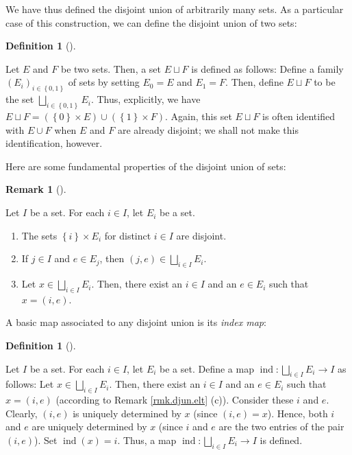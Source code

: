 \documentclass[numbers=enddot,12pt,final,onecolumn,notitlepage,abstracton]{scrartcl}
\theoremstyle{definition}
\newtheorem{defi}[theo]{Definition}
\newenvironment{definition}[1][]
{\begin{defi}[#1]\begin{leftbar}}
{\end{leftbar}\end{defi}}
\newtheorem{remk}[theo]{Remark}
\newenvironment{remark}[1][]
{\begin{remk}[#1]\begin{leftbar}}
{\end{leftbar}\end{remk}}
\newenvironment{verlong}{}{}
\begin{document}
\begin{verlong}
\begin{footnotesize}
We have thus defined the disjoint union of arbitrarily many sets. As a
particular case of this construction, we can define the disjoint union of two sets:

\begin{definition}
\label{def.djun.sets2}Let $E$ and $F$ be two sets. Then, a set $E\sqcup F$ is
defined as follows: Define a family $\left(  E_{i}\right)  _{i\in\left\{
0,1\right\}  }$ of sets by setting $E_{0}=E$ and $E_{1}=F$. Then, define
$E\sqcup F$ to be the set $\bigsqcup_{i\in\left\{  0,1\right\}  }E_{i}$. Thus,
explicitly, we have $E\sqcup F=\left(  \left\{  0\right\}  \times E\right)
\cup\left(  \left\{  1\right\}  \times F\right)  $. Again, this set $E\sqcup
F$ is often identified with $E\cup F$ when $E$ and $F$ are already disjoint;
we shall not make this identification, however.
\end{definition}

Here are some fundamental properties of the disjoint union of sets:

\begin{remark}
\label{rmk.djun.elt}Let $I$ be a set. For each $i\in I$, let $E_{i}$ be a set.

\begin{enumerate}
\item[(a)] The sets $\left\{  i\right\}  \times E_{i}$ for distinct $i\in I$
are disjoint.

\item[(b)] If $j\in I$ and $e\in E_{j}$, then $\left(  j,e\right)
\in\bigsqcup_{i\in I}E_{i}$.

\item[(c)] Let $x\in\bigsqcup_{i\in I}E_{i}$. Then, there exist an $i\in I$
and an $e\in E_{i}$ such that $x=\left(  i,e\right)  $.
\end{enumerate}
\end{remark}

A basic map associated to any disjoint union is its \textit{index map}:

\begin{definition}
\label{def.djun.ind}Let $I$ be a set. For each $i\in I$, let $E_{i}$ be a set.
Define a map $\operatorname*{ind}:\bigsqcup_{i\in I}E_{i}\rightarrow I$ as
follows: Let $x\in\bigsqcup_{i\in I}E_{i}$. Then, there exist an $i\in I$ and
an $e\in E_{i}$ such that $x=\left(  i,e\right)  $ (according to Remark
\ref{rmk.djun.elt} (c)). Consider these $i$ and $e$. Clearly, $\left(
i,e\right)  $ is uniquely determined by $x$ (since $\left(  i,e\right)  =x$).
Hence, both $i$ and $e$ are uniquely determined by $x$ (since $i$ and $e$ are
the two entries of the pair $\left(  i,e\right)  $). Set $\operatorname*{ind}%
\left(  x\right)  =i$. Thus, a map $\operatorname*{ind}:\bigsqcup_{i\in
I}E_{i}\rightarrow I$ is defined.


\end{definition}
\end{footnotesize}
\end{verlong}
\end{document}
